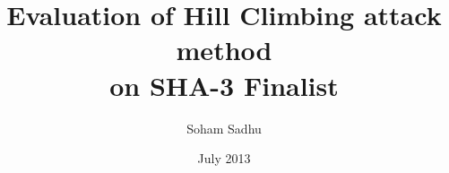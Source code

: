 \documentclass[12pt,american]{report}
\begin{document}
\title{\vspace{-0.20in} Evaluation of Hill Climbing attack method\\
   on SHA-3 Finalist}
\MSprojecttrue
\date{July 2013}

\author{Soham Sadhu}



\copyrightfalse%
{}

\beforepreface%
\end{document}
